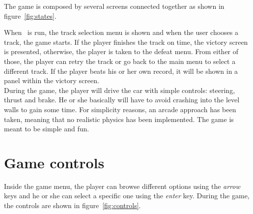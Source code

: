The game is composed by several screens connected together as shown in
figure~\ref{fig:states}.\\


When \game\ is run, the track selection menu is shown and when the user chooses a track,
the game starts. If the player finishes the track on time, the victory screen is presented,
otherwise, the player is taken to the defeat menu. From either of those, the player
can retry the track or go back to the main menu to select a different track. If the player
beats his or her own record, it will be shown in a panel within the victory screen.\\

During the game, the player will drive the car with simple controls: steering, thrust
and brake. He or she basically will have to avoid crashing into the level walls to gain
some time. For simplicity reasons, an arcade approach has been taken, meaning that no
realistic physics has been implemented. The game is meant to be simple and fun.\\

\section{Game controls}

Inside the game menu, the player can browse different options using the \textit{arrow}
keys and he or she can select a specific one using the \textit{enter} key. During the
game, the controls are shown in figure~\ref{fig:controls}.

